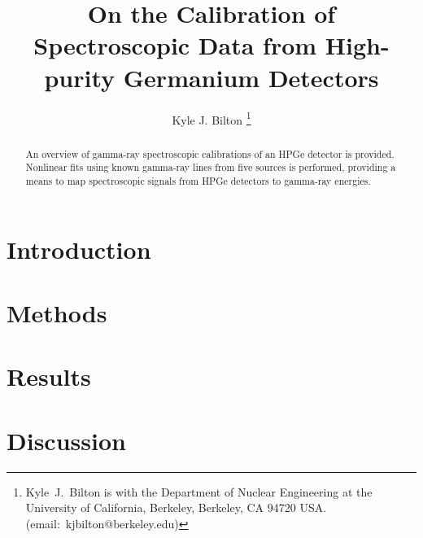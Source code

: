 \documentclass[journal]{IEEEtran}
\title{On the Calibration of Spectroscopic Data from High-purity Germanium Detectors}
\author{Kyle J. Bilton%
\thanks{Kyle~J.~Bilton is with the Department of Nuclear Engineering at the University of California, Berkeley, Berkeley, CA 94720 USA. (email:~\mbox{kjbilton@berkeley.edu})}}
\begin{document}
\maketitle

\begin{abstract}
An overview of gamma-ray spectroscopic calibrations of an HPGe detector is provided.
Nonlinear fits using known gamma-ray lines from five sources is performed, providing a means to map spectroscopic signals from HPGe detectors to gamma-ray energies.
\end{abstract}


\section{Introduction}
\label{sec:intro}


\section{Methods}
\label{sec:meth}


\section{Results}
\label{sec:res}


\section{Discussion}
\label{sec:disc}




\end{document}

